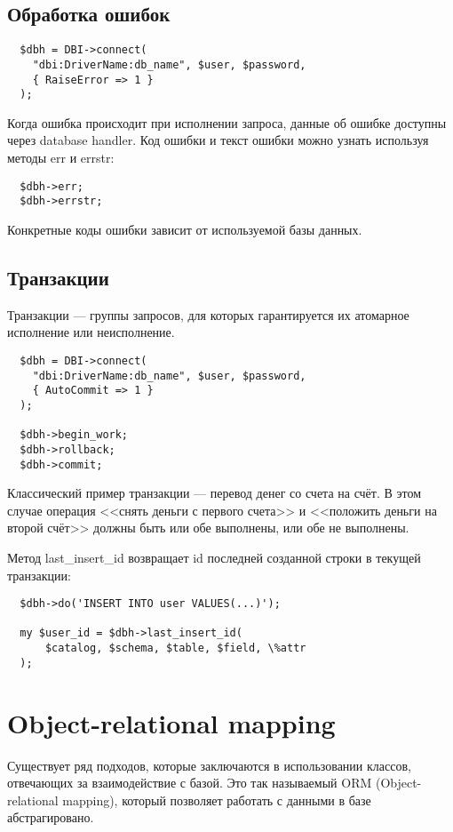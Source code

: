 \subsection{Обработка ошибок}

\begin{verbatim}
  $dbh = DBI->connect(
    "dbi:DriverName:db_name", $user, $password,
    { RaiseError => 1 }
  );
\end{verbatim}
Когда ошибка происходит при исполнении запроса, данные об ошибке доступны через database handler. Код ошибки и текст ошибки можно узнать используя методы err и errstr:
\begin{verbatim}
  $dbh->err;
  $dbh->errstr;
\end{verbatim}
Конкретные коды ошибки зависит от используемой базы данных.

\subsection{Транзакции}
Транзакции --- группы запросов, для которых гарантируется их атомарное исполнение или неисполнение.
\begin{verbatim}
  $dbh = DBI->connect(
    "dbi:DriverName:db_name", $user, $password,
    { AutoCommit => 1 }
  );

  $dbh->begin_work;
  $dbh->rollback;
  $dbh->commit;
\end{verbatim}
Классический пример транзакции --- перевод денег со счета на счёт. В этом случае операция <<снять деньги с первого счета>> и <<положить деньги на второй счёт>> должны быть или обе выполнены, или обе не выполнены.


Метод last\_insert\_id возвращает id последней созданной строки в текущей транзакции:
\begin{verbatim}
  $dbh->do('INSERT INTO user VALUES(...)');

  my $user_id = $dbh->last_insert_id(
      $catalog, $schema, $table, $field, \%attr
  );
\end{verbatim}

\section{Object-relational mapping}
Существует ряд подходов, которые заключаются в использовании классов, отвечающих за взаимодействие с базой. Это так называемый ORM (Object-relational mapping), который позволяет работать с данными в базе абстрагировано.

